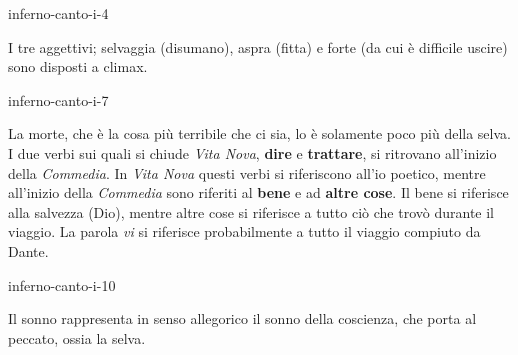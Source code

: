 \documentclass[preview]{standalone}
\begin{document}
\begin{snippet}{inferno-canto-i-4}

    I tre aggettivi; selvaggia (disumano), aspra (fitta) e forte (da cui è difficile uscire)
    sono disposti a climax.
\end{snippet}

\begin{snippet}{inferno-canto-i-7}
    
    La morte, che è la cosa più terribile che ci sia, lo è solamente poco più della selva.
    \\
    I due verbi sui quali si chiude \textit{Vita Nova},
    \textbf{dire} e \textbf{trattare}, si ritrovano all'inizio della \textit{Commedia}.
    In \textit{Vita Nova} questi verbi si riferiscono all'io poetico, mentre all'inizio della \textit{Commedia}
    sono riferiti al \textbf{bene} e ad \textbf{altre cose}.
    Il bene si riferisce alla salvezza (Dio), mentre altre cose si riferisce a tutto ciò che trovò durante il viaggio.
    La parola \textit{vi} si riferisce probabilmente a tutto il viaggio compiuto da Dante.
\end{snippet}

\begin{snippet}{inferno-canto-i-10}
    
    Il sonno rappresenta in senso allegorico il sonno della coscienza,
    che porta al peccato, ossia la selva.
\end{snippet}
\end{document}
